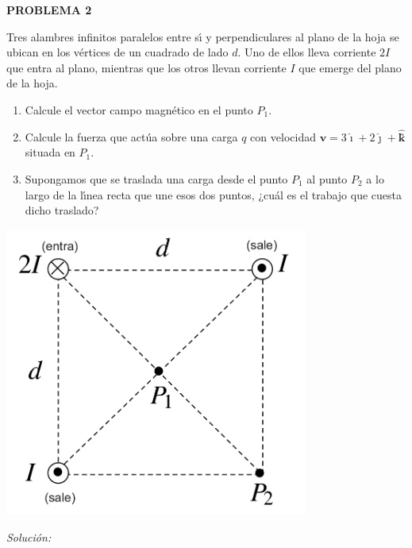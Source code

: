 \textbf{PROBLEMA 2}
\vspace{20px}

\newcommand{\ivec}{\boldsymbol{\hat{\imath}}}
\newcommand{\jvec}{\boldsymbol{\hat{\jmath}}}
\newcommand{\kvec}{\boldsymbol{\hat{k}}}

Tres alambres infinitos paralelos entre sı́ y perpendiculares al plano de la hoja se ubican en los vértices de
un cuadrado de lado $d$. Uno de ellos lleva corriente $2I$ que entra al plano, mientras que los otros llevan corriente
$I$ que emerge del plano de la hoja.\\

\begin{enumerate}[label=\alph*.]
    \item Calcule el vector campo magnético en el punto $P_1$.
    \item Calcule la fuerza que actúa sobre una carga $q$ con velocidad $\mathbf{v} = 3 \ivec
    + 2 \jvec  + \kvec$̃ situada en $P_1$.
    \item Supongamos que se traslada una carga desde el punto $P_1$ al punto $P_2$ a lo largo de la lı́nea recta que une
    esos dos puntos, ¿cuál es el trabajo que cuesta dicho traslado?
\end{enumerate}

\begin{center}
    \includegraphics[width=10cm]{files/img2}
\end{center}

\vspace{20px}
\textit{Solución:}
\\